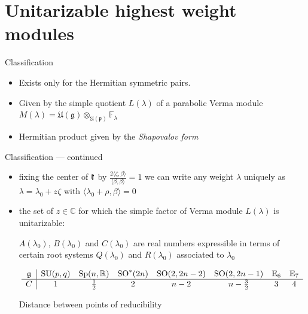 \documentclass[10pt]{beamer}
\begin{document}
\section{Unitarizable highest weight modules}
%

\begin{frame}{Classification}
\begin{itemize}[<+- | alert@+>]
	\item Exists only for the Hermitian symmetric pairs. 
	\item Given by the simple quotient $L(\lambda)$ of a parabolic Verma module $M(\lambda) = \mathfrak{U(g)\otimes_{U(p)}}\mathbb{F}_\lambda$
	\item Hermitian product given by the \emph{Shapovalov form}
\end{itemize}
\end{frame}

\begin{frame}{Classification --- continued}
\begin{itemize}[<+- | alert@+>]
\item fixing the center of $\mathfrak{k}$ by  $\frac{2 \langle \zeta,\beta \rangle}{\langle \beta, \beta \rangle} = 1$ we can write any weight $\lambda$ uniquely as $\lambda = \lambda_0 + z \zeta$ with  $\langle \lambda_0 + \rho,\beta \rangle = 0$
	\item the set of $z \in \mathbb{C}$ for which the simple factor of Verma module $L(\lambda)$ is unitarizable:
	
	
	$A(\lambda_0)$, $B(\lambda_0)$ and $C(\lambda_0)$ are real numbers expressible in terms of certain root systems $Q(\lambda_0)$ and $R(\lambda_0)$ associated to $\lambda_0$
	
	
\begin{table}[h]
\[\begin{array}{c|ccccccc}
\mathfrak{g} & \mathrm{SU}(p,q) & \mathrm{Sp}(n,\mathbb{R}) & \mathrm{SO}^*(2n) & \mathrm{SO}(2,2n-2) & \mathrm{SO}(2,2n-1) & \mathrm{E}_6 & \mathrm{E}_7\\\hline
C & 1 & \frac{1}{2} & 2 & n-2 & n-\frac{3}{2} & 3 & 4
\end{array}\]\caption{Distance between points of reducibility}\label{tbl:C}
\end{table}
\end{itemize}
\end{frame}
\end{document}
